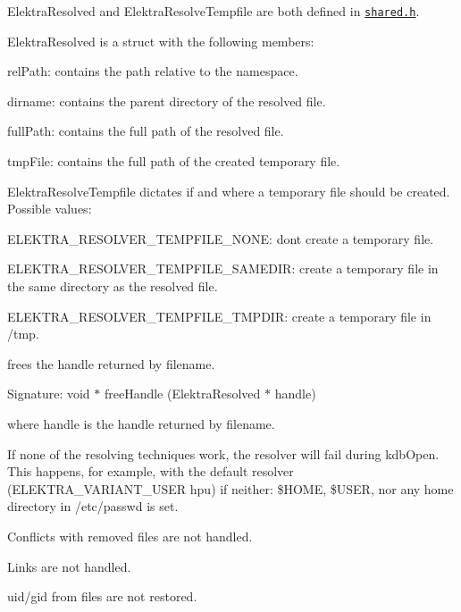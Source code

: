 {\ttfamily Elektra\+Resolved} and {\ttfamily Elektra\+Resolve\+Tempfile} are both defined in \href{/home/jenkins/workspace/libelektra-release/src/plugins/resolver/shared.h}{\tt shared.\+h}.

{\ttfamily Elektra\+Resolved} is a struct with the following members\+:


\begin{DoxyItemize}
\item {\ttfamily rel\+Path}\+: contains the path relative to the namespace.
\item {\ttfamily dirname}\+: contains the parent directory of the resolved file.
\item {\ttfamily full\+Path}\+: contains the full path of the resolved file.
\item {\ttfamily tmp\+File}\+: contains the full path of the created temporary file.
\end{DoxyItemize}

{\ttfamily Elektra\+Resolve\+Tempfile} dictates if and where a temporary file should be created. Possible values\+:


\begin{DoxyItemize}
\item {\ttfamily E\+L\+E\+K\+T\+R\+A\+\_\+\+R\+E\+S\+O\+L\+V\+E\+R\+\_\+\+T\+E\+M\+P\+F\+I\+L\+E\+\_\+\+N\+O\+NE}\+: don\textquotesingle{}t create a temporary file.
\item {\ttfamily E\+L\+E\+K\+T\+R\+A\+\_\+\+R\+E\+S\+O\+L\+V\+E\+R\+\_\+\+T\+E\+M\+P\+F\+I\+L\+E\+\_\+\+S\+A\+M\+E\+D\+IR}\+: create a temporary file in the same directory as the resolved file.
\item {\ttfamily E\+L\+E\+K\+T\+R\+A\+\_\+\+R\+E\+S\+O\+L\+V\+E\+R\+\_\+\+T\+E\+M\+P\+F\+I\+L\+E\+\_\+\+T\+M\+P\+D\+IR}\+: create a temporary file in {\ttfamily /tmp}.
\end{DoxyItemize}

frees the handle returned by {\ttfamily filename}.

Signature\+: {\ttfamily void $\ast$ free\+Handle (Elektra\+Resolved $\ast$ handle)}

where {\ttfamily handle} is the handle returned by {\ttfamily filename}.


\begin{DoxyItemize}
\item If none of the resolving techniques work, the resolver will fail during {\ttfamily kdb\+Open}. This happens, for example, with the default resolver (E\+L\+E\+K\+T\+R\+A\+\_\+\+V\+A\+R\+I\+A\+N\+T\+\_\+\+U\+S\+ER {\ttfamily hpu}) if neither\+: {\ttfamily \$\+H\+O\+ME}, {\ttfamily \$\+U\+S\+ER}, nor any home directory in {\ttfamily /etc/passwd} is set.
\item Conflicts with removed files are not handled.
\item Links are not handled.
\item uid/gid from files are not restored. 
\end{DoxyItemize}